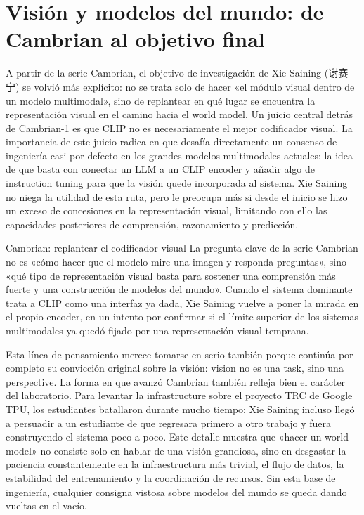 \section{Visión y modelos del mundo: de Cambrian al objetivo final}

A partir de la serie Cambrian, el objetivo de investigación de Xie Saining (谢赛宁) se volvió más explícito: no se trata solo de hacer «el módulo visual dentro de un modelo multimodal», sino de replantear en qué lugar se encuentra la representación visual en el camino hacia el world model. Un juicio central detrás de Cambrian-1 es que CLIP no es necesariamente el mejor codificador visual. La importancia de este juicio radica en que desafía directamente un consenso de ingeniería casi por defecto en los grandes modelos multimodales actuales: la idea de que basta con conectar un LLM a un CLIP encoder y añadir algo de instruction tuning para que la visión quede incorporada al sistema. Xie Saining no niega la utilidad de esta ruta, pero le preocupa más si desde el inicio se hizo un exceso de concesiones en la representación visual, limitando con ello las capacidades posteriores de comprensión, razonamiento y predicción.

\begin{knowledgebox}{Cambrian: replantear el codificador visual}
La pregunta clave de la serie Cambrian no es «cómo hacer que el modelo mire una imagen y responda preguntas», sino «qué tipo de representación visual basta para sostener una comprensión más fuerte y una construcción de modelos del mundo». Cuando el sistema dominante trata a CLIP como una interfaz ya dada, Xie Saining vuelve a poner la mirada en el propio encoder, en un intento por confirmar si el límite superior de los sistemas multimodales ya quedó fijado por una representación visual temprana.
\end{knowledgebox}

Esta línea de pensamiento merece tomarse en serio también porque continúa por completo su convicción original sobre la visión: vision no es una task, sino una perspective. La forma en que avanzó Cambrian también refleja bien el carácter del laboratorio. Para levantar la infrastructure sobre el proyecto TRC de Google TPU, los estudiantes batallaron durante mucho tiempo; Xie Saining incluso llegó a persuadir a un estudiante de que regresara primero a otro trabajo y fuera construyendo el sistema poco a poco. Este detalle muestra que «hacer un world model» no consiste solo en hablar de una visión grandiosa, sino en desgastar la paciencia constantemente en la infraestructura más trivial, el flujo de datos, la estabilidad del entrenamiento y la coordinación de recursos. Sin esta base de ingeniería, cualquier consigna vistosa sobre modelos del mundo se queda dando vueltas en el vacío.

